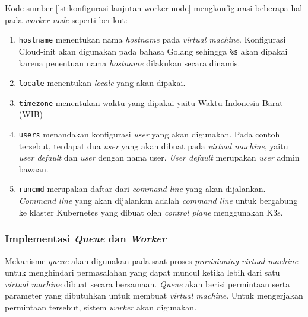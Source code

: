 

Kode sumber \ref{lst:konfigurasi-lanjutan-worker-node}
mengkonfigurasi beberapa hal pada \emph{worker node} seperti berikut:

\begin{enumerate}
  
  \item \lstinline{hostname} menentukan nama \emph{hostname} pada \emph{virtual machine}.
    Konfigurasi Cloud-init akan digunakan pada bahasa Golang sehingga \lstinline{%s}
    akan dipakai karena penentuan nama \emph{hostname} dilakukan secara dinamis.

  \item \lstinline{locale} menentukan \emph{locale} yang akan dipakai.

  \item \lstinline{timezone} menentukan waktu yang dipakai yaitu Waktu Indonesia Barat (WIB)

  \item \lstinline{users} menandakan konfigurasi \emph{user} yang akan digunakan. Pada
    contoh tersebut, terdapat dua \emph{user} yang akan dibuat pada \emph{virtual machine},
    yaitu \emph{user default} dan \emph{user} dengan nama user. \emph{User default} merupakan
    \emph{user} admin bawaan.

  \item \lstinline{runcmd} merupakan daftar dari \emph{command line} yang akan dijalankan.
    \emph{Command line} yang akan dijalankan adalah \emph{command line} untuk bergabung ke
    klaster Kubernetes yang dibuat oleh \emph{control plane} menggunakan K3s.

\end{enumerate}

\subsubsection{Implementasi \emph{Queue} dan \emph{Worker}}
\label{sec:implementasi-queue-dan-worker}

Mekanisme \emph{queue} akan digunakan pada saat proses \emph{provisioning}
\emph{virtual machine} untuk menghindari permasalahan yang dapat muncul ketika
lebih dari satu \emph{virtual machine} dibuat secara bersamaan. \emph{Queue}
akan berisi permintaan serta parameter yang dibutuhkan untuk membuat
\emph{virtual machine}. Untuk mengerjakan permintaan tersebut, sistem \emph{worker}
akan digunakan.

